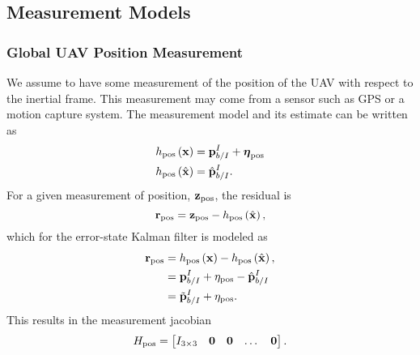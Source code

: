 
\subsection{Measurement Models}

\subsubsection{Global UAV Position Measurement}
We assume to have some measurement of the position of the UAV with respect to
the inertial
frame. This measurement may come from a sensor such as GPS or a motion capture system.
The measurement model and its estimate can
be written as
\begin{align}
  h_{\text{pos}} \left( \boldsymbol{\mathrm{x}} \right) &= \boldsymbol{\mathrm{p}}_{b/I}^I +
  \boldsymbol{\mathrm{\eta}}_{\text{pos}} \\
  h_{\text{pos}} \left( \hat{\boldsymbol{\mathrm{x}}} \right) &= \hat{\boldsymbol{\mathrm{p}}}_{b/I}^I.
\end{align}
For a given measurement of position, $\boldsymbol{\mathrm{z}}_{\text{pos}}$, the residual is
\begin{equation*}
  \boldsymbol{\mathrm{r}}_{\text{pos}} = \boldsymbol{\mathrm{z}}_{\text{pos}} - h_{\text{pos}} \left( \hat{\boldsymbol{\mathrm{x}}}
  \right),
\end{equation*}
which for the error-state Kalman filter is modeled as
\begin{align*}
  \boldsymbol{\mathrm{r}}_{\text{pos}} &=  h_{\text{pos}} \left( \boldsymbol{\mathrm{x}} \right) - h_{\text{pos}} \left( \hat{\boldsymbol{\mathrm{x}}}
  \right), \\
                        &= \boldsymbol{\mathrm{p}}_{b/I}^I + \eta_{\text{pos}} -
                        \hat{\boldsymbol{\mathrm{p}}}_{b/I}^I \\
                        &= \tilde{\boldsymbol{\mathrm{p}}}_{b/I}^I + \eta_{\text{pos}}.
\end{align*}
This results in the measurement jacobian
\begin{equation*}
  H_{\text{pos}} =
  \begin{bmatrix}
    I_{3 \times 3} & \boldsymbol{\mathrm{0}} & \boldsymbol{\mathrm{0}} & \dots & \boldsymbol{\mathrm{0}}
  \end{bmatrix}.
\end{equation*}



